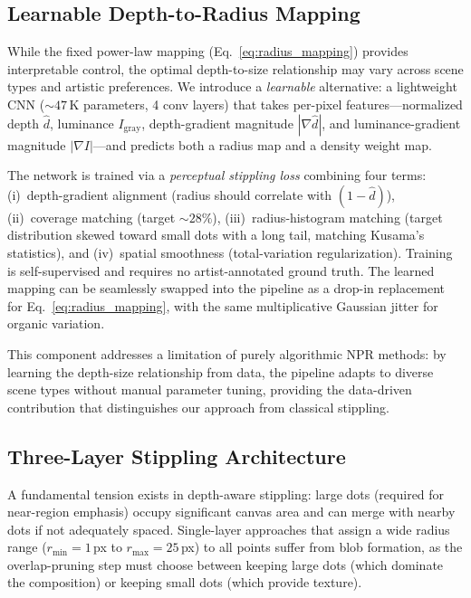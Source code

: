 \subsection{Learnable Depth-to-Radius Mapping}
\label{sec:method:learned}

While the fixed power-law mapping (Eq.~\ref{eq:radius_mapping}) provides
interpretable control, the optimal depth-to-size relationship may vary
across scene types and artistic preferences. We introduce a
\emph{learnable} alternative: a lightweight CNN
(${\sim}47$\,K parameters, 4 conv layers) that takes per-pixel
features---normalized depth $\hat{d}$, luminance $I_{\text{gray}}$,
depth-gradient magnitude $|\nabla\hat{d}|$, and luminance-gradient
magnitude $|\nabla I|$---and predicts both a radius map and a density
weight map.

The network is trained via a \emph{perceptual stippling loss}
combining four terms: (i)~depth-gradient alignment (radius should
correlate with $(1-\hat{d})$), (ii)~coverage matching (target
${\sim}28\%$), (iii)~radius-histogram matching (target distribution
skewed toward small dots with a long tail, matching Kusama's
statistics), and (iv)~spatial smoothness (total-variation
regularization). Training is self-supervised and requires no
artist-annotated ground truth. The learned mapping can be
seamlessly swapped into the pipeline as a drop-in replacement for
Eq.~\ref{eq:radius_mapping}, with the same multiplicative Gaussian
jitter for organic variation.

This component addresses a limitation of purely algorithmic NPR
methods: by learning the depth-size relationship from data, the
pipeline adapts to diverse scene types without manual parameter
tuning, providing the data-driven contribution that distinguishes
our approach from classical stippling.

\subsection{Three-Layer Stippling Architecture}
\label{sec:method:stippling}

A fundamental tension exists in depth-aware stippling: large dots
(required for near-region emphasis) occupy significant canvas area and
can merge with nearby dots if not adequately spaced. Single-layer
approaches that assign a wide radius range ($r_{\min} = 1$\,px to
$r_{\max} = 25$\,px) to all points suffer from blob formation, as the
overlap-pruning step must choose between keeping large dots (which
dominate the composition) or keeping small dots (which provide texture).

